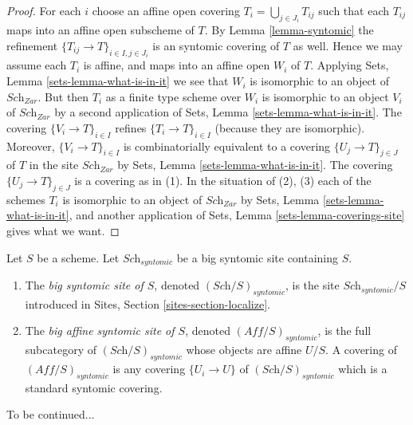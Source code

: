 \begin{proof}
For each $i$ choose an affine open covering $T_i = \bigcup_{j \in J_i} T_{ij}$
such that each $T_{ij}$ maps into an affine open subscheme of $T$. By
Lemma \ref{lemma-syntomic}
the refinement $\{T_{ij} \to T\}_{i \in I, j \in J_i}$ is an syntomic covering
of $T$ as well. Hence we may assume each $T_i$ is affine, and maps into
an affine open $W_i$ of $T$. Applying
Sets, Lemma \ref{sets-lemma-what-is-in-it}
we see that $W_i$ is isomorphic to an object of $\textit{Sch}_{Zar}$.
But then $T_i$ as a finite type scheme over $W_i$
is isomorphic to an object $V_i$ of $\textit{Sch}_{Zar}$ by a second
application of
Sets, Lemma \ref{sets-lemma-what-is-in-it}.
The covering $\{V_i \to T\}_{i \in I}$ refines $\{T_i \to T\}_{i \in I}$
(because they are isomorphic).
Moreover, $\{V_i \to T\}_{i \in I}$ is combinatorially equivalent to a
covering $\{U_j \to T\}_{j \in J}$ of $T$ in the site
$\textit{Sch}_{Zar}$ by
Sets, Lemma \ref{sets-lemma-what-is-in-it}.
The covering $\{U_j \to T\}_{j \in J}$ is a covering as in (1).
In the situation of (2), (3) each of the
schemes $T_i$ is isomorphic to an object of $\textit{Sch}_{Zar}$ by
Sets, Lemma \ref{sets-lemma-what-is-in-it},
and another application of
Sets, Lemma \ref{sets-lemma-coverings-site}
gives what we want.
\end{proof}

\begin{definition}
\label{definition-big-small-syntomic}
Let $S$ be a scheme. Let $\textit{Sch}_{syntomic}$ be a big syntomic
site containing $S$.
\begin{enumerate}
\item The {\it big syntomic site of $S$}, denoted
$(\textit{Sch}/S)_{syntomic}$, is the site $\textit{Sch}_{syntomic}/S$
introduced in Sites, Section \ref{sites-section-localize}.
\item The {\it big affine syntomic site of $S$}, denoted
$(\textit{Aff}/S)_{syntomic}$, is the full subcategory of
$(\textit{Sch}/S)_{syntomic}$ whose objects are affine $U/S$.
A covering of $(\textit{Aff}/S)_{syntomic}$ is any covering
$\{U_i \to U\}$ of $(\textit{Sch}/S)_{syntomic}$ which is a
standard syntomic covering.
\end{enumerate}
\end{definition}

\noindent
To be continued...

